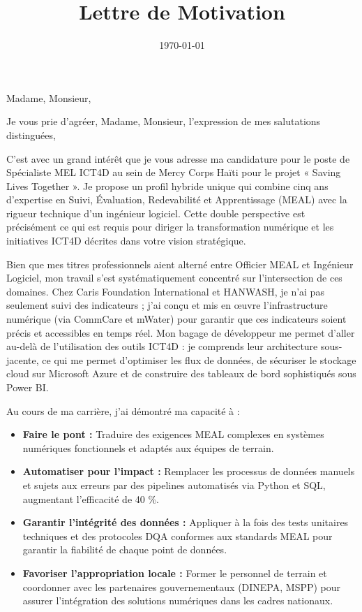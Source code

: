 \documentclass[11pt,a4paper,sans]{moderncv}
\title{Lettre de Motivation}
\begin{document}
\date{\today}
\opening{Madame, Monsieur,}
\closing{Je vous prie d'agréer, Madame, Monsieur, l'expression de mes salutations distinguées,}

\makelettertitle

C’est avec un grand intérêt que je vous adresse ma candidature pour le poste de Spécialiste MEL ICT4D au sein de Mercy Corps Haïti pour le projet « Saving Lives Together ». Je propose un profil hybride unique qui combine cinq ans d’expertise en Suivi, Évaluation, Redevabilité et Apprentissage (MEAL) avec la rigueur technique d’un ingénieur logiciel. Cette double perspective est précisément ce qui est requis pour diriger la transformation numérique et les initiatives ICT4D décrites dans votre vision stratégique.

Bien que mes titres professionnels aient alterné entre Officier MEAL et Ingénieur Logiciel, mon travail s’est systématiquement concentré sur l’intersection de ces domaines. Chez Caris Foundation International et HANWASH, je n'ai pas seulement suivi des indicateurs ; j'ai conçu et mis en œuvre l'infrastructure numérique (via CommCare et mWater) pour garantir que ces indicateurs soient précis et accessibles en temps réel. Mon bagage de développeur me permet d'aller au-delà de l'utilisation des outils ICT4D : je comprends leur architecture sous-jacente, ce qui me permet d'optimiser les flux de données, de sécuriser le stockage cloud sur Microsoft Azure et de construire des tableaux de bord sophistiqués sous Power BI.

Au cours de ma carrière, j’ai démontré ma capacité à :
\begin{itemize}
    \item \textbf{Faire le pont :} Traduire des exigences MEAL complexes en systèmes numériques fonctionnels et adaptés aux équipes de terrain.
    \item \textbf{Automatiser pour l'impact :} Remplacer les processus de données manuels et sujets aux erreurs par des pipelines automatisés via Python et SQL, augmentant l'efficacité de 40 \%.
    \item \textbf{Garantir l'intégrité des données :} Appliquer à la fois des tests unitaires techniques et des protocoles DQA conformes aux standards MEAL pour garantir la fiabilité de chaque point de données.
    \item \textbf{Favoriser l'appropriation locale :} Former le personnel de terrain et coordonner avec les partenaires gouvernementaux (DINEPA, MSPP) pour assurer l'intégration des solutions numériques dans les cadres nationaux.
\end{itemize}
\end{document}

